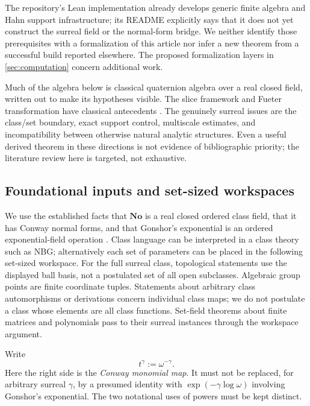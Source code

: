 \documentclass[11pt,letterpaper]{article}
\numberwithin{equation}{section}
\theoremstyle{definition}
\theoremstyle{remark}
\newcommand{\No}{\mathbf{No}}
\begin{document}
The repository's Lean implementation already develops generic finite algebra and Hahn support
infrastructure; its README explicitly says that it does not yet construct the surreal field or
the normal-form bridge. We neither identify those prerequisites with a formalization of this
article nor infer a new theorem from a successful build reported elsewhere. The proposed
formalization layers in \cref{sec:computation} concern additional work.

Much of the algebra below is classical quaternion algebra over a real closed field, written out
to make its hypotheses visible. The slice framework and Fueter transformation have classical
antecedents \cite{Voight,GP}. The genuinely surreal issues are the class/set boundary, exact
support control, multiscale estimates, and incompatibility between otherwise natural analytic
structures. Even a useful derived theorem in these directions is not evidence of bibliographic
priority; the literature review here is targeted, not exhaustive.

\subsection{Foundational inputs and set-sized workspaces}
We use the established facts that $\No$ is a real closed ordered class field, that it has Conway
normal forms, and that Gonshor's exponential is an ordered exponential-field operation
\cite{Conway,Gonshor,vdDE}. Class language can be interpreted in a class theory such as NBG;
alternatively each set of parameters can be placed in the following set-sized workspace.
For the full surreal class, topological statements use the displayed ball basis, not a
postulated set of all open subclasses. Algebraic group points are finite coordinate tuples.
Statements about arbitrary class automorphisms or derivations concern individual class maps;
we do not postulate a class whose elements are all class functions. Set-field theorems about
finite matrices and polynomials pass to their surreal instances through the workspace argument.

Write
\begin{equation}\label{eq:monomial}
 t^\gamma:=\omega^{-\gamma}.
\end{equation}
Here the right side is the \emph{Conway monomial map}. It must not be replaced, for arbitrary
surreal $\gamma$, by a presumed identity with
$\exp(-\gamma\log\omega)$ involving Gonshor's exponential. The two notational uses of powers
must be kept distinct.
\end{document}
